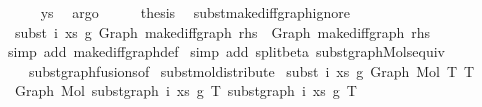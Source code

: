 \begin{isabellebody}
\ \ \ \ \isamarkupfalse%
\ ys\ \isamarkupfalse%
\ argo\isanewline
\ \ \isamarkupfalse%
\ \isamarkupfalse%
\ {\isacharquery}{\kern0pt}thesis\ \isakeywordONE{{\isachardot}{\kern0pt}}\isamarkupfalse%
\isanewline
{}\isamarkupfalse%
%
\endisatagproof
{\isafoldproof}%
%
\isadelimproof
\isanewline
%
\endisadelimproof
\isanewline
\isanewline
\isanewline
\isanewline
\isanewline
{}\isamarkupfalse%
\ subst{\isacharunderscore}{\kern0pt}make{\isacharunderscore}{\kern0pt}diffgraph{\isacharunderscore}{\kern0pt}ignore{\isacharcolon}{\kern0pt}\isanewline
\ \ {\isachardoublequoteopen}subst\ i\ xs\ g{}\ {\isacharparenleft}{\kern0pt}Graph\ {\isacharparenleft}{\kern0pt}make{\isacharunderscore}{\kern0pt}diffgraph\ rhs{\isacharparenright}{\kern0pt}{\isacharparenright}{\kern0pt}\ {\isacharequal}{\kern0pt}\ Graph\ {\isacharparenleft}{\kern0pt}make{\isacharunderscore}{\kern0pt}diffgraph\ rhs{\isacharparenright}{\kern0pt}{\isachardoublequoteclose}\isanewline
%
\isadelimproof
%
\endisadelimproof
%
\isatagproof
{}\isamarkupfalse%
\ {\isacharparenleft}{\kern0pt}simp\ add{\isacharcolon}{\kern0pt}\ make{\isacharunderscore}{\kern0pt}diffgraph{\isacharunderscore}{\kern0pt}def{\isacharparenright}{\kern0pt}\isanewline
{}\isamarkupfalse%
\ {\isacharparenleft}{\kern0pt}simp\ add{\isacharcolon}{\kern0pt}\ split{\isacharunderscore}{\kern0pt}beta\ subst{\isacharunderscore}{\kern0pt}graph{\isacharunderscore}{\kern0pt}Mols{}{\isacharunderscore}{\kern0pt}equiv\isanewline
\ \ \ \ subst{\isacharunderscore}{\kern0pt}graph{\isacharunderscore}{\kern0pt}fusions{\isacharunderscore}{\kern0pt}of{\isacharparenright}{\kern0pt}%
\endisatagproof
{\isafoldproof}%
%
\isadelimproof
\isanewline
%
\endisadelimproof
\isanewline
\isanewline
{}\isamarkupfalse%
\ subst{\isacharunderscore}{\kern0pt}mol{\isacharunderscore}{\kern0pt}distribute{\isacharcolon}{\kern0pt}\isanewline
\ {\isachardoublequoteopen}subst\ i\ xs\ g{}\ {\isacharparenleft}{\kern0pt}Graph\ {\isacharparenleft}{\kern0pt}Mol\ T{}\ T{}{\isacharparenright}{\kern0pt}{\isacharparenright}{\kern0pt}\ {\isacharequal}{\kern0pt}\isanewline
\ \ Graph\ {\isacharparenleft}{\kern0pt}Mol\ {\isacharparenleft}{\kern0pt}subst{\isacharunderscore}{\kern0pt}graph\ i\ xs\ g{}\ T{}{\isacharparenright}{\kern0pt}\ {\isacharparenleft}{\kern0pt}subst{\isacharunderscore}{\kern0pt}graph\ i\ xs\ g{}\ T{}{\isacharparenright}{\kern0pt}{\isacharparenright}{\kern0pt}{\isachardoublequoteclose}\isanewline

\end{isabellebody}
